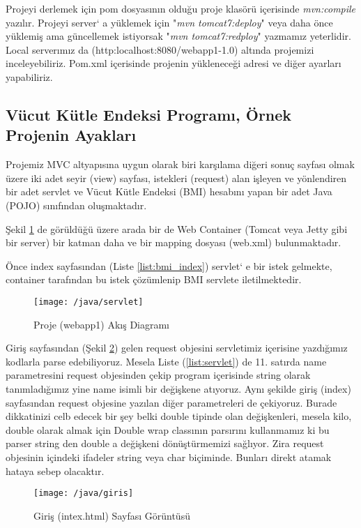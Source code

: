 
Projeyi derlemek için pom dosyasının olduğu proje klasörü içerisinde \emph{mvn:compile} yazılır.
Projeyi server` a yüklemek için "\emph{mvn tomcat7:deploy}" veya daha önce yüklemiş ama güncellemek istiyorsak "\emph{mvn tomcat7:redploy}" yazmamız yeterlidir. Local serverımız da (http:localhost:8080/webapp1-1.0) altında projemizi inceleyebiliriz. Pom.xml içerisinde projenin yükleneceği adresi ve diğer ayarları yapabiliriz.

\subsection{Vücut Kütle Endeksi Programı, Örnek Projenin Ayakları}
Projemiz  MVC altyapısına uygun olarak biri karşılama diğeri sonuç sayfası olmak üzere iki adet seyir (view) sayfası, istekleri (request) alan işleyen ve yönlendiren bir adet servlet ve Vücut Kütle Endeksi (BMI) hesabını yapan bir adet Java (POJO) sınıfından oluşmaktadır. 

Şekil \ref{fig:servletAkis} de görüldüğü üzere arada bir de Web Container (Tomcat veya Jetty gibi bir server) bir katman daha ve bir mapping dosyası (web.xml) bulunmaktadır. 

Önce index sayfasından (Liste \ref{list:bmi_index}) servlet` e bir istek gelmekte, container tarafından bu istek çözümlenip BMI servlete iletilmektedir.
\begin{figure}[h]
\centering\texttt{[image: /java/servlet]}
\caption{Proje (webapp1) Akış Diagramı}
\label{fig:servletAkis}
\end{figure}


Giriş sayfasından (Şekil \ref{fig:giris}) gelen request objesini servletimiz içerisine yazdığımız kodlarla parse edebiliyoruz. Mesela Liste (\ref{list:servlet}) de 11. satırda name parametresini request objesinden çekip program içerisinde string olarak tanımladığımız yine name isimli bir değişkene atıyoruz. Aynı şekilde giriş (index) sayfasından request objesine yazılan diğer parametreleri de çekiyoruz. Burade dikkatinizi celb edecek bir şey belki double tipinde olan değişkenleri, mesela kilo, double olarak almak için Double wrap classının parsırını kullanmamız ki bu parser string den double a değişkeni dönüştürmemizi sağlıyor. Zira request objesinin içindeki ifadeler string veya char biçiminde. Bunları direkt atamak hataya sebep olacaktır.  
\begin{figure}
	\texttt{[image: /java/giris]}
\centering\caption{Giriş (intex.html) Sayfası Görüntüsü}
	\label{fig:giris}
\end{figure}

